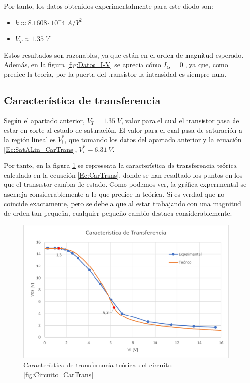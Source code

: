 Por tanto, los datos obtenidos experimentalmente para este diodo son:
\begin{itemize}
    \item $k \approx 8.1608\cdot 10^-4 \; A/V^2 $
    \item $V_T \approx 1.35\;V$
\end{itemize}

Estos resultados son razonables, ya que están en el orden de magnitud esperado. Además, en la figura \ref{fig:Datos_I-V} se aprecia cómo $I_G=0\;$, ya que, como predice la teoría, por la puerta del transistor la intensidad es siempre nula.


\subsection{Característica de transferencia}
Según el apartado anterior, $V_T = 1.35\;V$, valor para el cual el transistor pasa de estar en corte al estado de saturación.
El valor para el cual pasa de saturación a la región lineal es $V_i^*$, que tomando los datos del apartado anterior y la ecuación \ref{Ec:SatALin_CarTrans}, $V_i^*= 6.31\;V$.

Por tanto, en la figura \ref{fig:CarTrans_Teo} se representa la característica de transferencia teórica calculada en la ecuación \ref{Ec:CarTrans}, donde se han resaltado los puntos en los que el transistor cambia de estado. Como podemos ver, la gráfica experimental se asemeja considerablemente a lo que predice la teórica. Sí es verdad que no coincide exactamente, pero se debe a que al estar trabajando con una magnitud de orden tan pequeña, cualquier pequeño cambio destaca considerablemente.
\begin{figure}
    \centering
    \includegraphics[width=12cm]{Imágenes 05/CarTrans_Teo.png}
    \caption{Característica de transferencia teórica del circuito \ref{fig:Circuito_CarTrans}.}
    \label{fig:CarTrans_Teo}
\end{figure}

